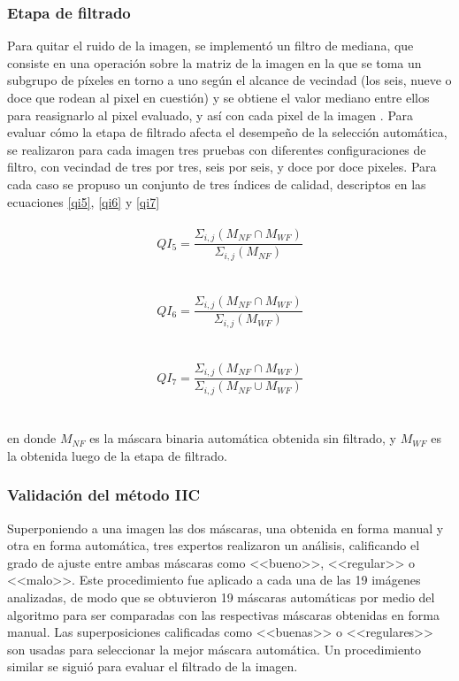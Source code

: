 \subsubsection{Etapa de filtrado}
Para quitar el ruido de la imagen, se implementó un filtro de mediana, que consiste en una operación sobre la matriz de la imagen en la que se toma un subgrupo de píxeles en torno a uno según el alcance de vecindad (los seis, nueve o doce que rodean al pixel en cuestión) y se obtiene el valor mediano entre ellos para reasignarlo al pixel evaluado, y así con cada pixel de la imagen \cite{lim_two-dimensional_1990}. Para evaluar cómo la etapa de filtrado afecta el desempeño de la selección automática, se realizaron para cada imagen tres pruebas con diferentes configuraciones de filtro, con vecindad de tres por tres, seis por seis, y  doce por doce pixeles. Para cada caso se propuso un conjunto de tres índices de calidad, descriptos en las ecuaciones \ref{qi5}, \ref{qi6} y \ref{qi7}
\\
\\
 \begin{equation}
    QI_5=\frac{\Sigma _{i,j}(M_{NF}\cap M_{WF})}{\Sigma _{i,j}(M_{NF}) }
    \label{qi5}
\end{equation}
\\
\\
 \begin{equation}
    QI_6=\frac{\Sigma_{i,j}(M_{NF}\cap M_{WF})}{\Sigma _{i,j}(M_{WF}) }
    \label{qi6}
\end{equation}
\\
\\
\begin{equation}
    QI_7=\frac{\Sigma _{i,j}(M_{NF}\cap M_{WF})}{\Sigma _{i,j}(M_{NF}\cup M_{WF}) }
    \label{qi7}
\end{equation}
\\
\\
en donde $M_{NF}$ es la máscara binaria automática obtenida sin filtrado, y $M_{WF}$ es la obtenida luego de la etapa de filtrado.

\subsubsection{Validación del método IIC} \label{Validacion}
Superponiendo a una imagen las dos máscaras, una obtenida en forma manual y otra en forma automática, tres expertos realizaron un análisis, calificando el grado de ajuste entre ambas máscaras como <<bueno>>, <<regular>> o <<malo>>. Este procedimiento fue aplicado a cada una de las 19 imágenes analizadas, de modo que se obtuvieron 19 máscaras automáticas por medio del algoritmo para ser comparadas con las respectivas máscaras obtenidas en forma manual. Las superposiciones calificadas como <<buenas>> o <<regulares>> son usadas para seleccionar la mejor máscara automática. Un procedimiento similar se siguió para evaluar el filtrado de la imagen.



